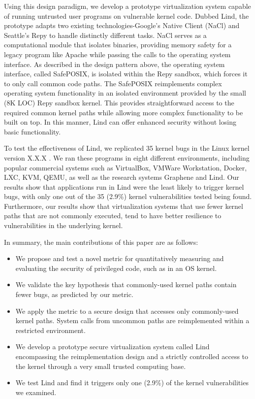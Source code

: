 Using this design paradigm, we develop a prototype virtualization system capable
of running untrusted user programs on vulnerable kernel code. Dubbed Lind, the
prototype adapts two existing technologies-Google's Native Client (NaCl) and
Seattle's Repy to handle distinctly different tasks. NaCl serves as a computational
module that isolates binaries, providing memory safety for a legacy program like
Apache while passing the calls to the operating system interface.  As described
in the design pattern above, the operating system interface, called SafePOSIX,
is isolated within the Repy sandbox, which forces it to only call common code paths.
The SafePOSIX reimplements complex operating system functionality in an isolated
environment provided by the small (8K LOC) Repy sandbox kernel. This provides
straightforward access to the required common kernel paths while allowing more
complex functionality to be built on top.
In this manner, Lind can offer enhanced security without losing basic functionality.

To test the effectiveness of Lind, we replicated 35 kernel bugs in the Linux kernel
version X.X.X .  We ran these programs in eight different environments, including
popular commercial systems such as VirtualBox, VMWare Workstation, Docker, LXC,
KVM, QEMU, as well as the research systems Graphene and Lind. Our results show
that applications run in Lind were the least likely to trigger kernel bugs,
with only one out of the 35 (2.9\%) kernel vulnerabilities tested being found.
Furthermore, our results show that virtualization systems that use fewer kernel
paths that are not commonly executed, tend to have better resilience to vulnerabilities
in the underlying kernel.  

In summary, the main contributions of this paper are as follows:

\begin{itemize}
\item
We propose and test a novel metric for quantitatively measuring and evaluating
the security of privileged code, such as in an OS kernel.

\item
We validate the key hypothesis that commonly-used kernel paths contain fewer bugs,
as predicted by our metric.

\item
We apply the metric to a secure design that accesses only commonly-used
kernel paths. System calls from uncommon paths are reimplemented within a
restricted environment.

\item
We develop a prototype secure virtualization system called Lind encompassing
the reimplementation design and a strictly controlled access to the kernel
through a very small trusted computing base.

\item
We test Lind and find it triggers only one (2.9\%) of the kernel vulnerabilities
we examined.
\end{itemize}

